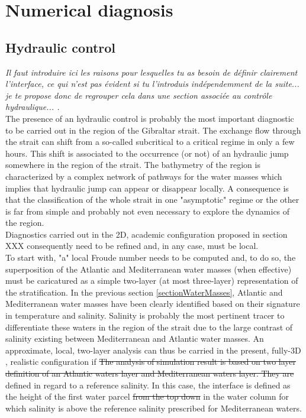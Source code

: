 \section{Numerical diagnosis}
\label{PartDiag3D}

\subsection{Hydraulic control}
\color{green} 
\textit{Il faut introduire ici les raisons pour lesquelles tu as besoin de définir clairement l'interface, ce qui n'est pas évident si tu l'introduis indépendemment de la suite... je te propose donc de regrouper cela dans une section associée au contrôle hydraulique... .} \color{black}\\

\color{blue}The presence of an hydraulic control is probably the most important diagnostic to be carried out in the region of the Gibraltar strait. The exchange flow through the strait can shift from a so-called subcritical to a critical regime in only a few hours. This shift is associated to the occurrence (or not) of an hydraulic jump somewhere in the region of the strait. The bathymetry of the region is characterized by a complex network of pathways for the water masses which implies that hydraulic jump can appear or disappear locally. A consequence is that the classification of the whole strait in one "asymptotic" regime or the other is far from simple and probably not even necessary to explore the dynamics of the region.\\
Diagnostics carried out in the 2D, academic configuration proposed in section {XXX} consequently need to be refined and, in any case, must be local.\\
To start with, "a" local Froude number needs to be computed and, to do so,  the superposition of the Atlantic and Mediterranean water masses (when effective) must be caricatured as a simple two-layer (at most three-layer) representation of the stratification.
In the previous section \ref{sectionWaterMasses}, Atlantic and Mediterranean water masses have been clearly identified based on their signature in temperature and salinity. Salinity is probably the most pertinent tracer to differentiate these waters in the region of the strait due to the large contrast of salinity existing between Mediterranean and Atlantic water masses.
An approximate, local, two-layer analysis can thus be carried in the present, fully-3D , realistic configuration if
\color{black}
\sout{The analysis of simulation result is based on two layer definition of an Atlantic waters layer and Mediterranean waters layer. They are} defined in regard to a reference salinity. In this case, the interface is defined as the height of the first water parcel \sout{from the top down} in the water column for which salinity is above the reference salinity prescribed for Mediterranean waters.

